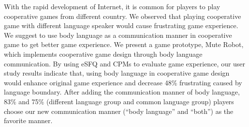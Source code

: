 
With the rapid development of Internet, it is common for players to play cooperative games from different country. 
We observed that playing cooperative game with different language speaker would cause frustrating game experience.
We suggest to use body language as a communication manner in cooperative game to get better game experience. 
We present a game prototype, Mute Robot, which implements cooperative game design through body language communication.
By using eSFQ\cite{eSFQ} and CPMs\cite{CPMs} to evaluate game experience, our user study results indicate that, using body language in cooperative game design would enhance original game experience and decrease 48\% frustrating caused by language boundary.
After adding the communication manner of body language, 83\% and 75\% (different language group and common language group) players choose our new communication manner (``body language'' and ``both'') as the favorite manner. 